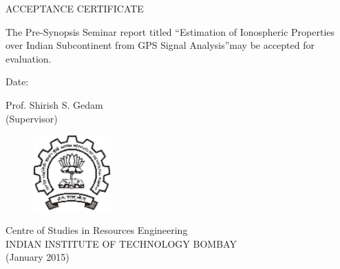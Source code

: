 \clearpage
\thispagestyle{empty}
\begin{center}\huge
ACCEPTANCE CERTIFICATE
\end{center}
\vspace{1in}
The Pre-Synopsis Seminar report titled \textquotedblleft Estimation of Ionospheric Properties over Indian Subcontinent from GPS Signal Analysis\textquotedblright may be accepted for evaluation. 

\begin{flushleft}
Date:	
\end{flushleft}
\begin{flushright}
Prof. Shirish S. Gedam\\
(Supervisor)~~~~~~~~~
\end{flushright}

\vspace{3in}

 \begin{figure}[htb]
 \centering
 \includegraphics[width=3cm]{./iitblogo}
 \end{figure}
 
\begin{center}\large
Centre of Studies in Resources Engineering\\
INDIAN INSTITUTE OF TECHNOLOGY BOMBAY\\
(January 2015)
\end{center}

